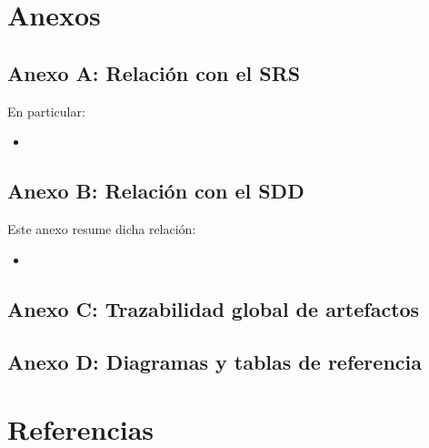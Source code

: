 \documentclass[11pt,a4paper]{article}
\DeclareRobustCommand{\_}{\textunderscore\allowbreak}
\begin{document}
\section{Anexos}



\subsection{Anexo A: Relaci\'on con el SRS}


En particular:
\begin{itemize}
    \item 
\end{itemize}



\subsection{Anexo B: Relaci\'on con el SDD}


Este anexo resume dicha relaci\'on:
\begin{itemize}
    \item 
\end{itemize}



\subsection{Anexo C: Trazabilidad global de artefactos}


\subsection{Anexo D: Diagramas y tablas de referencia}


\section{Referencias}
\end{document}
